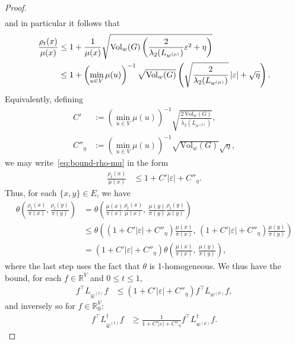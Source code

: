 \documentclass[10pt,a4paper]{amsart}
\newcommand{\Vol}{\mathrm{Vol}}
\begin{document}
\begin{proof}
\begin{align*}
        \end{align*}
    and in particular it follows that
        \begin{align}\label{eq:bound-rho-mu}
            \frac{\rho_t(x)}{\mu(x)} &\leq 1 + \frac{1}{\mu(x)}\sqrt{\Vol_w(G)\left(\frac{2}{\lambda_2(L_{w^{(\mu)}})}\varepsilon^2 + \eta\right)}\notag\\
            &\leq 1 + \left(\min_{u\in V}\mu(u)\right)^{-1}\sqrt{\Vol_w(G)}\left(\sqrt{\frac{2}{\lambda_2(L_{w^{(\mu)}})}}\,|\varepsilon| + \sqrt{\eta}\right).
        \end{align}
    Equivalently, defining
        \begin{align*}
            C' &:= \left(\min_{u\in V}\mu(u)\right)^{-1}\sqrt{\frac{2\,\Vol_w(G)}{\lambda_2(L_{w^{(\mu)}})}},\\
            C''_{\eta} &:= \left(\min_{u\in V}\mu(u)\right)^{-1}\sqrt{\Vol_w(G)}\sqrt{\eta},
        \end{align*}
    we may write~\cref{eq:bound-rho-mu} in the form
        \begin{align*}
            \frac{\rho_t(x)}{\mu(x)} &\leq 1 + C' |\varepsilon| + C''_{\eta}.
        \end{align*}
    Thus, for each $\{x,y\}\in E$, we have
        \begin{align*}
            \theta\left(\frac{\rho_t(x)}{\pi(x)}, \frac{\rho_t(y)}{\pi(y)}\right)
            &= \theta\left(\frac{\mu(x)}{\pi(x)}\frac{\rho_t(x)}{\mu(x)},\,\frac{\mu(y)}{\pi(y)}\frac{\rho_t(y)}{\mu(y)}\right)\\
            &\leq \theta\left(\left(1+C'|\varepsilon|+C''_{\eta}\right)\frac{\mu(x)}{\pi(x)},\,\left(1+C'|\varepsilon|+C''_{\eta}\right)\frac{\mu(y)}{\pi(y)}\right)\\
            &= \left(1+C'|\varepsilon|+C''_{\eta}\right)\theta\left(\frac{\mu(x)}{\pi(x)},\,\frac{\mu(y)}{\pi(y)}\right),
        \end{align*}
    where the last step uses the fact that $\theta$ is 1-homogeneous. We thus have the bound, for each $f\in\mathbb{R}^{V}$ and $0\le t\le 1$,
        \begin{align*}
            f^\top L_{\widehat{w}^{(t)}} f &\leq \left(1 + C'|\varepsilon| + C''_{\eta}\right) f^\top L_{w^{(\mu)}} f,
        \end{align*} 
    and inversely so for $f\in\mathbb{R}^{V}_0$:
        \begin{align}\label{eq:bound-Z}
            f^\top L_{\widehat{w}^{(t)}}^{\dagger} f &\geq \frac{1}{1 + C'|\varepsilon| + C''_{\eta}} f^\top L_{w^{(\mu)}}^{\dagger} f.

\end{align}
\end{proof}
\end{document}
